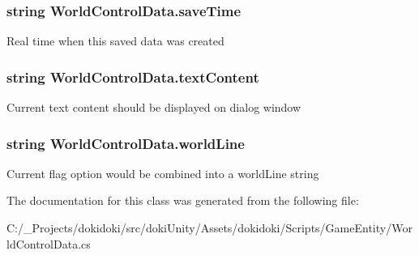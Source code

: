 \subsubsection[{\texorpdfstring{save\+Time}{saveTime}}]{\setlength{\rightskip}{0pt plus 5cm}string World\+Control\+Data.\+save\+Time}\hypertarget{class_world_control_data_af238477a57c06f651bee36cfd63079a1}{}\label{class_world_control_data_af238477a57c06f651bee36cfd63079a1}


Real time when this saved data was created 

\subsubsection[{\texorpdfstring{text\+Content}{textContent}}]{\setlength{\rightskip}{0pt plus 5cm}string World\+Control\+Data.\+text\+Content}\hypertarget{class_world_control_data_a097f2be6dfe4824c8a291bc377496656}{}\label{class_world_control_data_a097f2be6dfe4824c8a291bc377496656}


Current text content should be displayed on dialog window 

\subsubsection[{\texorpdfstring{world\+Line}{worldLine}}]{\setlength{\rightskip}{0pt plus 5cm}string World\+Control\+Data.\+world\+Line}\hypertarget{class_world_control_data_af8a811def6db783cc181e2a18d2dfbc7}{}\label{class_world_control_data_af8a811def6db783cc181e2a18d2dfbc7}


Current flag option would be combined into a world\+Line string 



The documentation for this class was generated from the following file\+:\begin{DoxyCompactItemize}
\item 
C\+:/\+\_\+\+Projects/dokidoki/src/doki\+Unity/\+Assets/dokidoki/\+Scripts/\+Game\+Entity/World\+Control\+Data.\+cs\end{DoxyCompactItemize}
